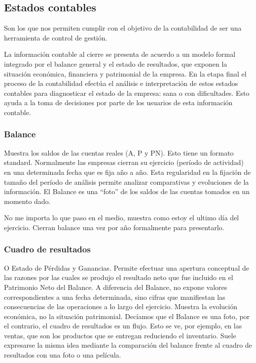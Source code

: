 \documentclass[titlepage,a4paper]{article}
\begin{document}
\subsection{Estados contables}
Son los que nos permiten cumplir con el objetivo de la contabilidad de ser una herramienta de control de gestión.

 La información contable al cierre
se presenta de acuerdo a un modelo formal integrado por el balance general y el estado de resultados, que
exponen la situación económica, financiera y patrimonial de la empresa. En la etapa final el proceso de la
contabilidad efectúa el análisis e interpretación de estos estados contables para diagnosticar el estado de la
empresa: sana o con dificultades. Esto ayuda a la toma de decisiones por parte de los usuarios de esta
información contable.

\subsubsection*{Balance}
Muestra los saldos de las cuentas reales (A, P y PN). Esto tiene un formato standard. Normalmente las
empresas cierran su ejercicio (período de actividad) en una determinada fecha que es fija año a año. Esta
regularidad en la fijación de tamaño del período de análisis permite analizar comparativas y evoluciones de
la información. El Balance es una “foto” de los saldos de las cuentas tomados en un momento dado.

No me importa lo que paso en el medio, muestra como estoy el ultimo día del ejercicio. Cierran balance una vez por año formalmente para presentarlo.

\subsubsection*{Cuadro de resultados}
O Estado de Pérdidas y Ganancias. Permite efectuar una apertura conceptual de las razones por las
cuales se produjo el resultado neto que fue incluido en el Patrimonio Neto del Balance. A diferencia del
Balance, no expone valores correspondientes a una fecha determinada, sino cifras que manifiestan las
consecuencias de las operaciones a lo largo del ejercicio. Muestra la evolución económica, no la situación
patrimonial. Decíamos que el Balance es una foto, por el contrario, el cuadro de resultados es un flujo. Esto
se ve, por ejemplo, en las ventas, que son los productos que se entregan reduciendo el inventario. Suele
expresarse la misma idea mediante la comparación del balance frente al cuadro de resultados con una foto
o una película.
\end{document}
